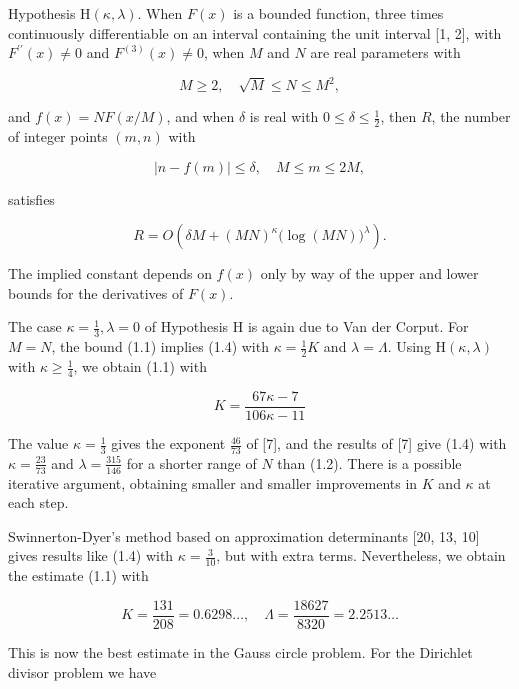 \documentclass[10pt]{article}
\begin{document}
Hypothesis $\mathrm{H}(\kappa, \lambda)$. When $F(x)$ is a bounded function, three times continuously differentiable on an interval containing the unit interval [1, 2], with $F^{\prime \prime}(x) \neq 0$ and $F^{(3)}(x) \neq 0$, when $M$ and $N$ are real parameters with


\begin{equation*}
M \geqslant 2, \quad \sqrt{M} \leqslant N \leqslant M^{2}, \tag{1.2}
\end{equation*}


and $f(x)=N F(x / M)$, and when $\delta$ is real with $0 \leqslant \delta \leqslant \frac{1}{2}$, then $R$, the number of integer points $(m, n)$ with


\begin{equation*}
|n-f(m)| \leqslant \delta, \quad M \leqslant m \leqslant 2 M, \tag{1.3}
\end{equation*}


satisfies


\begin{equation*}
R=O\left(\delta M+(MN)^{\kappa}\bigl(\log(MN)\bigr)^{\lambda}\right). \tag{1.4}
\end{equation*}


The implied constant depends on $f(x)$ only by way of the upper and lower bounds for the derivatives of $F(x)$.

The case $\kappa=\frac{1}{3}, \lambda=0$ of Hypothesis H is again due to Van der Corput. For $M=N$, the bound (1.1) implies (1.4) with $\kappa=\frac{1}{2} K$ and $\lambda=\Lambda$. Using $\mathrm{H}(\kappa, \lambda)$ with $\kappa \geqslant \frac{1}{4}$, we obtain (1.1) with

$$
K=\frac{67 \kappa-7}{106 \kappa-11}
$$

The value $\kappa=\frac{1}{3}$ gives the exponent $\frac{46}{73}$ of [7], and the results of [7] give (1.4) with $\kappa=\frac{23}{73}$ and $\lambda=\frac{315}{146}$ for a shorter range of $N$ than (1.2). There is a possible iterative argument, obtaining smaller and smaller improvements in $K$ and $\kappa$ at each step.

Swinnerton-Dyer's method based on approximation determinants [20, 13, 10] gives results like (1.4) with $\kappa=\frac{3}{10}$, but with extra terms. Nevertheless, we obtain the estimate (1.1) with

$$
K=\frac{131}{208}=0.6298 \ldots, \quad \Lambda=\frac{18627}{8320}=2.2513 \ldots
$$

This is now the best estimate in the Gauss circle problem. For the Dirichlet divisor problem we have
\end{document}
